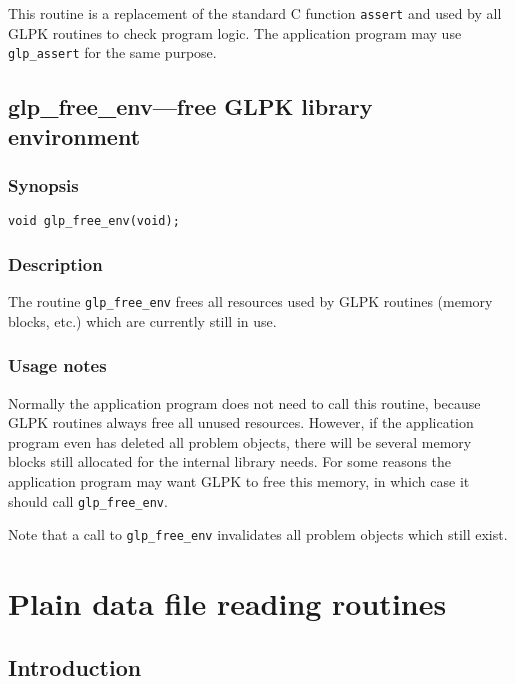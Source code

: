 This routine is a replacement of the standard C function \verb|assert|
and used by all GLPK routines to check program logic. The application
program may use \verb|glp_assert| for the same purpose.

\subsection{glp\_free\_env---free GLPK library environment}

\subsubsection*{Synopsis}

\begin{verbatim}
void glp_free_env(void);
\end{verbatim}

\subsubsection*{Description}

The routine \verb|glp_free_env| frees all resources used by GLPK
routines (memory blocks, etc.) which are currently still in use.

\subsubsection*{Usage notes}

Normally the application program does not need to call this routine,
because GLPK routines always free all unused resources. However, if
the application program even has deleted all problem objects, there
will be several memory blocks still allocated for the internal library
needs. For some reasons the application program may want GLPK to free
this memory, in which case it should call \verb|glp_free_env|.

Note that a call to \verb|glp_free_env| invalidates all problem objects
which still exist.


\newpage

\section{Plain data file reading routines}

\subsection{Introduction}

